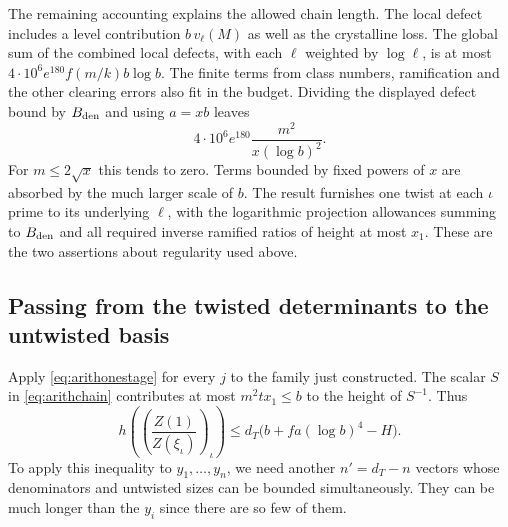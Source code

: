 The remaining accounting explains the allowed chain length. The local defect includes a level contribution \(b\,v_\ell(M)\) as well as the crystalline loss. The global sum of the combined local defects, with each $\ell$ weighted by $\log\ell$, is at most $4\cdot10^6e^{180} f(m/k)b\log b$. The finite terms from class numbers, ramification and the other clearing errors also fit in the budget. Dividing the displayed defect bound by $B_{\rm den}$ and using $a=xb$ leaves
\[
          4\cdot10^6 e^{180}\frac{m^2}{x(\log b)^2}.
\]
For $m\le2\sqrt{x}$ this tends to zero. Terms bounded by fixed powers of $x$ are absorbed by the much larger scale of $b$. The result furnishes one twist at each $\iota$ prime to its underlying $\ell$, with the logarithmic projection allowances summing to $B_{\rm den}$ and all required inverse ramified ratios of height at most $x_1$. These are the two assertions about regularity used above.

\subsection{Passing from the twisted determinants to the untwisted basis}
Apply \eqref{eq:arithonestage} for every $j$ to the family just constructed. The scalar $S$ in \eqref{eq:arithchain} contributes at most $m^2tx_1\le b$ to the height of $S^{-1}$. Thus
\begin{equation}
 h\!\left(\left(\frac{Z(1)}{Z(\xi_\iota)}\right)_\iota\right)
       \le d_T\bigl(b+fa(\log b)^4-H\bigr).
 \label{eq:arithfull}
\end{equation}
To apply this inequality to $y_1,\ldots,y_n$, we need another $n'=d_T-n$ vectors whose denominators and untwisted sizes can be bounded simultaneously. They can be much longer than the $y_i$ since there are so few of them.


